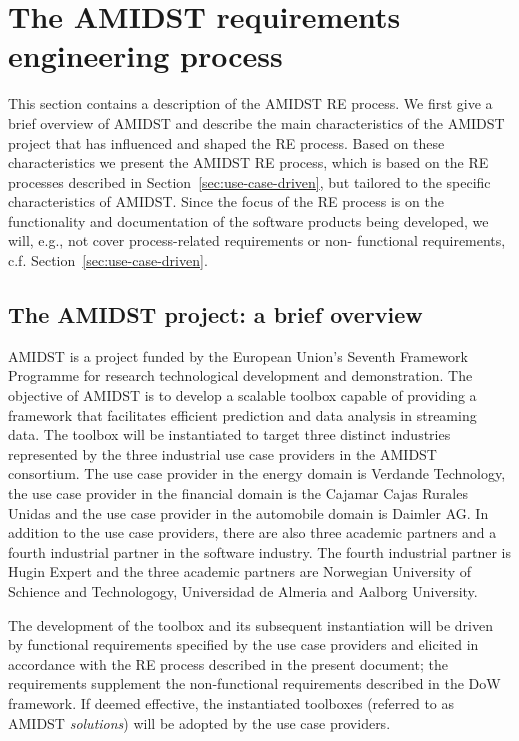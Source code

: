 \section{The AMIDST requirements engineering process}
\label{sec:AmidstRequirementProcess}

This section contains a description of the AMIDST RE process.  We first give a brief overview of AMIDST and describe the 
main characteristics of the AMIDST project that has influenced and shaped the RE process. Based on these characteristics 
we present the AMIDST RE process, which is based on the RE processes described in Section~\ref{sec:use-case-driven}, 
but tailored to the specific characteristics of AMIDST. Since the focus of the RE process is on the functionality and 
documentation of the software products being developed, we will, e.g., not cover process-related requirements or non-
functional requirements, c.f. Section~\ref{sec:use-case-driven}. 

\subsection{The AMIDST project: a brief overview}

AMIDST is a project funded by the European Union's Seventh Framework Programme for research technological development and demonstration. The objective of AMIDST is to develop a scalable toolbox capable of providing a framework that facilitates efficient prediction and data analysis in streaming data. The toolbox will be instantiated to target three distinct industries represented by the three industrial use case providers in the AMIDST consortium. The use case provider in the energy domain is Verdande Technology, the use case provider in the financial domain is the Cajamar Cajas Rurales Unidas and the use case provider in the automobile domain is Daimler AG.  In addition to the use case providers, there are also three academic partners and a fourth industrial partner in the software industry.  The fourth industrial partner is Hugin Expert and the three academic partners are Norwegian University of Schience and Technologogy, Universidad de Almeria and Aalborg University.

The development of the toolbox and its subsequent instantiation will be driven by functional requirements specified by the use case providers and elicited in accordance with the RE process described in the present document; the requirements supplement the non-functional requirements described in the DoW framework. If deemed effective, the instantiated toolboxes (referred to as AMIDST \emph{solutions}) will be adopted by the use case providers. 

